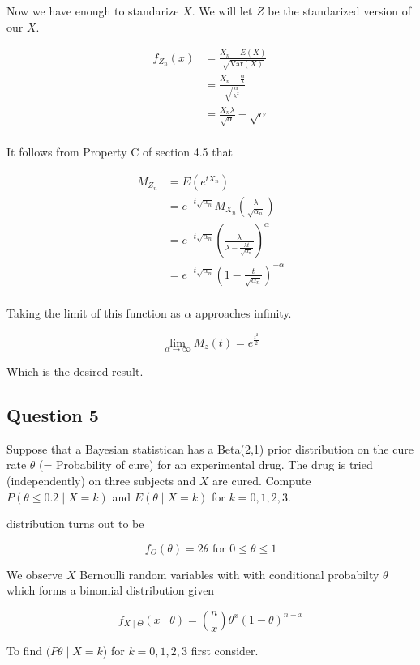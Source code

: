 \documentclass{tufte-book}
\newcommand{\Var}{\mathrm{Var}}
\theoremstyle{mytheoremstyle}
\theoremstyle{mylemstyle}
\theoremstyle{mydefstyle}
\begin{document}
Now we have enough to standarize $X$.  We will let $Z$ be the standarized version of our $X$.

\begin{align*}
f_{Z_n}(x) &= \frac{X_n - E(X)}{\sqrt{\Var(X)}}\\
&= \frac{X_n - \frac{\alpha}{\lambda}}{\sqrt{\frac{\alpha}{\lambda^2}}}\\
&= \frac{X_n \lambda}{\sqrt{\alpha}} - \sqrt{\alpha}\\
\end{align*}

It follows from Property C of section 4.5 that

\begin{align*}
M_{Z_n} &= E(e^{tX_n})\\
&= e^{-t\sqrt{\alpha_n}} M_{X_n}(\frac{\lambda }{\sqrt{\alpha_n}})\\
&= e^{-t\sqrt{\alpha_n}} (\frac{\lambda}{\lambda-\frac{\lambda t}{\sqrt{\alpha_n}}})^\alpha\\
&= e^{-t\sqrt{\alpha_n}}  (1-\frac{t}{\sqrt{\alpha_n}})^{-\alpha}\\
\end{align*}

Taking the limit of this function as $\alpha$ approaches infinity.

\[ \lim_{\alpha \to \infty}M_z(t) = e^{\frac{t^2}{2}} \]

Which is the desired result.


\subsection{Question 5}
Suppose that a Bayesian statistican has a Beta(2,1) prior distribution on the cure rate $\theta$ (= Probability of cure) for an experimental drug.  The drug is tried (independently) on three subjects and $X$ are cured.  Compute $P(\theta \leq 0.2 \mid X =k)$ and $E(\theta \mid X=k)$ for $k=0,1,2,3$.

 distribution turns out to be

\[ f_\Theta(\theta) = 2\theta  \text{ for } 0 \leq \theta \leq 1\]

We observe $X$ Bernoulli random variables with with conditional probabilty $\theta$ which forms a binomial distribution given

\[f_{X\mid \Theta}(x \mid \theta) = \binom{n}{x}\theta^x(1-\theta)^{n-x} \]

To find $(P \theta \mid X=k$) for $k=0,1,2,3$ first consider.
\end{document}
